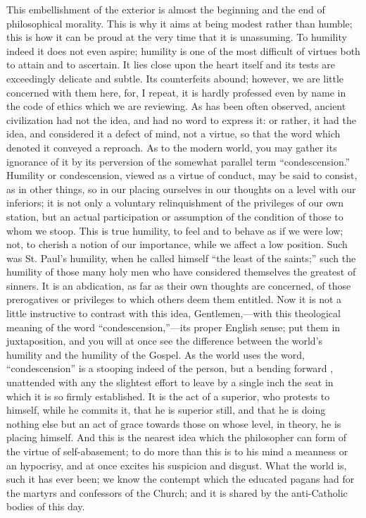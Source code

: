 This embellishment of the exterior is almost the beginning and the
end of philosophical morality. This is why it aims at being modest
rather than humble; this is how it can be proud at the very time that
it is unassuming. To humility indeed it does not even aspire; humility is one of the most difficult of virtues both to attain and to
ascertain. It lies close upon the heart itself and its tests are
exceedingly delicate and subtle. Its counterfeits abound; however, we
are little concerned with them here, for, I repeat, it is hardly
professed even by name in the code of ethics which we are reviewing.
As has been often observed, ancient civilization had not the idea, and
had no word to express it: or rather, it had the idea, and considered
it a defect of mind, not a virtue, so that the word which denoted it
conveyed a reproach. As to the modern world, you may gather its
ignorance of it by its perversion of the somewhat parallel term
``condescension.'' Humility or condescension, viewed as a
virtue of conduct, may be said to consist, as in other things, so in
our placing ourselves in our thoughts on a level with our inferiors;
it is not only a voluntary relinquishment of the privileges of our own
station, but an actual participation or assumption of the condition of
those to whom we stoop. This is true humility, to feel and to behave
as if we were low; not, to cherish a notion of our importance, while
we affect a low position. Such was St. Paul's humility, when he called
himself ``the least of the saints;'' such the humility of
those many holy men who have considered themselves the greatest of
sinners. It is an abdication, as far as their own thoughts are
concerned, of those prerogatives or privileges to which others deem
them entitled. Now it is not a little instructive to contrast with
this idea, Gentlemen,—with this theological meaning of the word
``condescension,''—its proper English sense; put them in
juxtaposition, and you will at once see the difference between the
world's humility and the humility of the Gospel. As the world uses the
word, ``condescension'' is a stooping indeed of the person,
but a bending forward , unattended with any the slightest effort
to leave by a single inch the seat in which it is so firmly
established. It is the act of a superior, who protests to himself,
while he commits it, that he is superior still, and that he is doing
nothing else but an act of grace towards those on whose level, in
theory, he is placing himself. And this is the nearest idea which the
philosopher can form of the virtue of self-abasement; to do more than
this is to his mind a meanness or an hypocrisy, and at once excites
his suspicion and disgust. What the world is, such it has ever been;
we know the contempt which the educated pagans had for the martyrs and
confessors of the Church; and it is shared by the anti-Catholic bodies
of this day.

